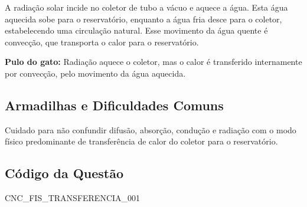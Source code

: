 \documentclass{article}
\begin{document}
A radiação solar incide no coletor de tubo a vácuo e aquece a água. Esta água aquecida sobe para o reservatório, enquanto a água fria desce para o coletor, estabelecendo uma circulação natural. Esse movimento da água quente é convecção, que transporta o calor para o reservatório.

\textbf{Pulo do gato:} Radiação aquece o coletor, mas o calor é transferido internamente por convecção, pelo movimento da água aquecida.

\subsection*{Armadilhas e Dificuldades Comuns}

Cuidado para não confundir difusão, absorção, condução e radiação com o modo físico predominante de transferência de calor do coletor para o reservatório.

\subsection*{Código da Questão}

CNC\_FIS\_TRANSFERENCIA\_001
\end{document}
